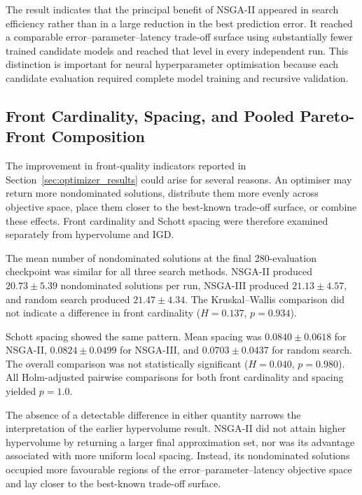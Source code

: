 \documentclass[a4paper,fleqn]{cas-sc}
\begin{document}
The result indicates that the principal benefit of NSGA-II appeared in search efficiency rather than in a large reduction in the best prediction error. It reached a comparable error--parameter--latency trade-off surface using substantially fewer trained candidate models and reached that level in every independent run. This distinction is important for neural hyperparameter optimisation because each candidate evaluation required complete model training and recursive validation.


\subsection{Front Cardinality, Spacing, and Pooled Pareto-Front Composition}
\label{sec:front_structure}

The improvement in front-quality indicators reported in Section~\ref{sec:optimizer_results} could arise for several reasons. An optimiser may return more nondominated solutions, distribute them more evenly across objective space, place them closer to the best-known trade-off surface, or combine these effects. Front cardinality and Schott spacing were therefore examined separately from hypervolume and IGD.

The mean number of nondominated solutions at the final 280-evaluation checkpoint was similar for all three search methods. NSGA-II produced $20.73\pm5.39$ nondominated solutions per run, NSGA-III produced $21.13\pm4.57$, and random search produced $21.47\pm4.34$. The Kruskal--Wallis comparison did not indicate a difference in front cardinality ($H=0.137$, $p=0.934$).

Schott spacing showed the same pattern. Mean spacing was $0.0840\pm0.0618$ for NSGA-II, $0.0824\pm0.0499$ for NSGA-III, and $0.0703\pm0.0437$ for random search. The overall comparison was not statistically significant ($H=0.040$, $p=0.980$). All Holm-adjusted pairwise comparisons for both front cardinality and spacing yielded $p=1.0$.


The absence of a detectable difference in either quantity narrows the interpretation of the earlier hypervolume result. NSGA-II did not attain higher hypervolume by returning a larger final approximation set, nor was its advantage associated with more uniform local spacing. Instead, its nondominated solutions occupied more favourable regions of the error--parameter--latency objective space and lay closer to the best-known trade-off surface.
\end{document}
